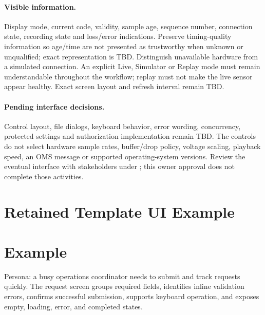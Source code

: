 \paragraph{Visible information.}
Display mode, current code, validity, sample age, sequence number, connection
state, recording state and loss/error indications. Preserve timing-quality
information so age/time are not presented as trustworthy when unknown or
unqualified; exact representation is TBD. Distinguish unavailable hardware
from a simulated connection. An explicit Live, Simulator or Replay mode must
remain understandable throughout the workflow; replay must not make the live
sensor appear healthy. Exact screen layout and refresh interval remain TBD.

\paragraph{Pending interface decisions.}
Control layout, file dialogs, keyboard behavior, error wording, concurrency,
protected settings and authorization implementation remain TBD. The controls
do not select hardware sample rates, buffer/drop policy, voltage scaling,
playback speed, an OMS message or supported operating-system versions.
Review the eventual interface with stakeholders under
; this owner approval does not complete those activities.

\section{Retained Template UI Example}
\section{Example}
Persona: a busy operations coordinator needs to submit and track requests quickly. The request screen groups required fields, identifies inline validation errors, confirms successful submission, supports keyboard operation, and exposes empty, loading, error, and completed states.

